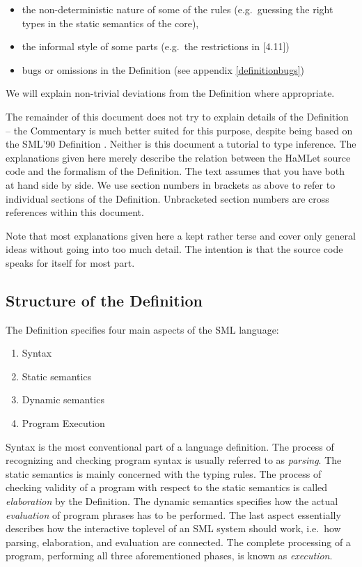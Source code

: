 \documentclass[twoside,titlepage]{article}
\begin{document}
\begin{itemize}
\setlength{\parskip}{0ex}
\item the non-deterministic nature of some of the rules (e.g.\ guessing the right types in the static semantics of the core),
\item the informal style of some parts (e.g.\ the restrictions in [4.11])
\item bugs or omissions in the Definition (see appendix \ref{definitionbugs})
\end{itemize}

We will explain non-trivial deviations from the Definition where appropriate.

The remainder of this document does not try to explain details of the Definition -- the Commentary \cite{commentary} is much better suited for this purpose, despite being based on the SML'90 Definition \cite{definition90}. Neither is this document a tutorial to type inference. The explanations given here merely describe the relation between the HaMLet source code and the formalism of the Definition. The text assumes that you have both at hand side by side. We use section numbers in brackets as above to refer to individual sections of the Definition. Unbracketed section numbers are cross references within this document.

Note that most explanations given here a kept rather terse and cover only general ideas without going into too much detail. The intention is that the source code speaks for itself for most part.


\subsection{Structure of the Definition}
\label{definitionstructure}

The Definition specifies four main aspects of the SML language:

\begin{enumerate}
\setlength{\parskip}{0ex}
\item Syntax
\item Static semantics
\item Dynamic semantics
\item Program Execution
\end{enumerate}

Syntax is the most conventional part of a language definition. The process of recognizing and checking program syntax is usually referred to as {\em parsing}. The static semantics is mainly concerned with the typing rules. The process of checking validity of a program with respect to the static semantics is called {\em elaboration} by the Definition. The dynamic semantics specifies how the actual {\em evaluation} of program phrases has to be performed. The last aspect essentially describes how the interactive toplevel of an SML system should work, i.e.\ how parsing, elaboration, and evaluation are connected. The complete processing of a program, performing all three aforementioned phases, is known as {\em execution}.
\end{document}
